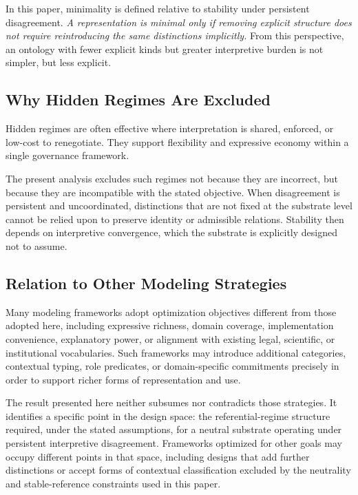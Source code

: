 In this paper, minimality is defined relative to stability under persistent disagreement.
\emph{A representation is minimal only if removing explicit structure does not
require reintroducing the same distinctions implicitly.}
From this perspective, an ontology with fewer explicit kinds but greater
interpretive burden is not simpler, but less explicit.

\subsection{Why Hidden Regimes Are Excluded}

Hidden regimes are often effective where interpretation is shared,
enforced, or low-cost to renegotiate.
They support flexibility and expressive economy within a single
governance framework.

The present analysis excludes such regimes not because they are incorrect,
but because they are incompatible with the stated objective.
When disagreement is persistent and uncoordinated, distinctions that are
not fixed at the substrate level cannot be relied upon to preserve identity
or admissible relations.
Stability then depends on interpretive convergence, which the substrate is
explicitly designed not to assume.

\subsection{Relation to Other Modeling Strategies}

Many modeling frameworks adopt optimization objectives different from those
adopted here, including expressive richness, domain coverage, implementation
convenience, explanatory power, or alignment with existing legal, scientific,
or institutional vocabularies.
Such frameworks may introduce additional categories, contextual typing,
role predicates, or domain-specific commitments precisely in order to support
richer forms of representation and use.

The result presented here neither subsumes nor contradicts those strategies.
It identifies a specific point in the design space:
the referential-regime structure required, under the stated assumptions,
for a neutral substrate operating under persistent interpretive disagreement.
Frameworks optimized for other goals may occupy different
points in that space, including designs that add further distinctions or
accept forms of contextual classification excluded by the neutrality and
stable-reference constraints used in this paper.


